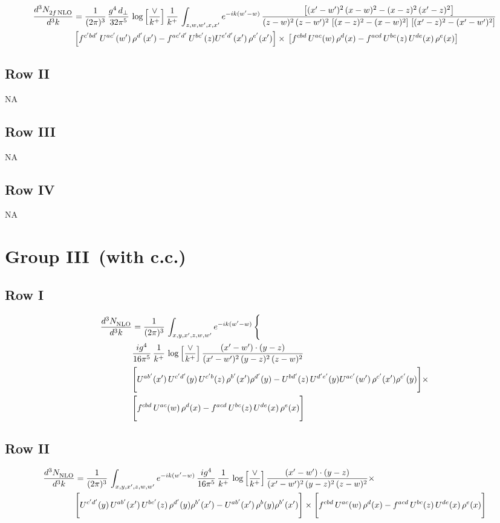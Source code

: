 \documentclass[9pt]{article}
\numberwithin{equation}{section}
\begin{document}
\begin{align}
    \frac{d^{3}N_{2f\,\rm NLO}^{\rm}}{d^{3}k}  & = \frac{1}{(2\pi)^{3}}\, \frac{g^{4}\,d_{\perp}}{32\pi^{5}}\,\log{\left[\frac{\vee}{ k^{+}}\right]}\,\frac{1}{k^{+}}\,\int_{z,w,w^{\prime},x,x'} e^{-ik(w^{\prime}-w)}\,\frac{\left[(x'-w')^{2}\, (x-w)^{2} - (x-z)^{2}\, (x'-z)^{2}\right]}{(z-w)^{2}\, (z-w')^{2}\,\left[(x-z)^{2} - (x-w)^{2}\right]\, \left[(x'-z)^{2} - (x'-w')^{2}\right]}\notag \\ &   \left[f^{c'bd'}\, U^{ac'}(w')\,\rho^{d'}(x')-f^{ac'd'}\, U^{bc'}(z)U^{e'd'}(x')\, \rho^{e'}(x')\right]\times\, \left[f^{cbd}\, U^{ac}(w)\,\rho^{d}(x) - f^{acd}\, U^{bc}(z)\,U^{de}(x)\, \rho^{e}(x)\right]
\end{align}
\subsection{Row II}
\textsc{NA}
\subsection{Row III}
\textsc{NA}
\subsection{Row IV}
\textsc{NA}
\section{Group III\, (with c.c.)}
\subsection{Row I}
\begin{align}
     \frac{d^{3}N_{\rm NLO}^{\rm}}{d^{3}k}  & =  \frac{1}{(2\pi)^{3}}\, \int_{x,y,x',z,w,w^{\prime}} e^{-ik(w^{\prime}-w)}\, \Bigg\{\notag \\ & \frac{ig^{4}}{16\pi^{5}}\,\frac{1}{k^{+}}\,\log{\left[\frac{\vee}{k^{+}}\right]}\, \frac{(x'-w')\cdot (y-z)}{(x'-w')^{2}\,(y-z)^{2}\,(z-w)^{2}}\notag \\ &  \Bigg[U^{ab'}(x')\,U^{c'd'}(y)\,U^{c'b}(z)\,\rho^{b'}(x')\rho^{d'}(y)-U^{bd'}(z)\,U^{d'e'}(y)U^{ac'}(w')\,\rho^{c'}(x')\rho^{e'}(y)\Bigg]\times\notag \\ & \Bigg[f^{cbd}\,U^{ac}(w)\,\rho^{d}(x)-f^{acd}\, U^{bc}(z)\,U^{de}(x)\,\rho^{e}(x)\Bigg] 
\end{align}
\subsection{Row II}
\begin{align}
     \frac{d^{3}N_{\rm NLO}^{\rm}}{d^{3}k}  & =  \frac{1}{(2\pi)^{3}}\, \int_{x,y,x',z,w,w^{\prime}} e^{-ik(w^{\prime}-w)}\, \frac{ig^{4}}{16\pi^{5}}\,\frac{1}{k^{+}}\,\log{\left[\frac{\vee}{k^{+}}\right]}\, \frac{(x'-w')\cdot (y-z)}{(x'-w')^{2}\,(y-z)^{2}\,(z-w)^{2}}\times\,\notag \\ & \Bigg[U^{c'd'}(y)\,U^{ab'}(x')\,U^{bc'}(z)\,\rho^{d'}(y)\rho^{b'}(x')-U^{ab'}(x')\,\rho^{b}(y)\rho^{b'}(x')\Bigg]\times \Bigg[f^{cbd}\,U^{ac}(w)\,\rho^{d}(x)-f^{acd}\, U^{bc}(z)\,U^{de}(x)\,\rho^{e}(x)\Bigg]
\end{align}
\end{document}
